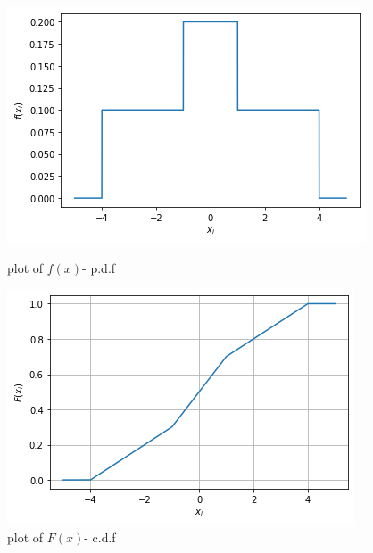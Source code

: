\begin{figure}[!ht]
\centering
 \includegraphics[width=\columnwidth]{solutions/ec/20/figures/graph_pdf.png}
 \caption{plot of $f(x)$- p.d.f}
     \includegraphics[width=\columnwidth]{solutions/ec/20/figures/graph_cdf.png}
     \caption{plot of $F(x)$- c.d.f}
 \end{figure}



